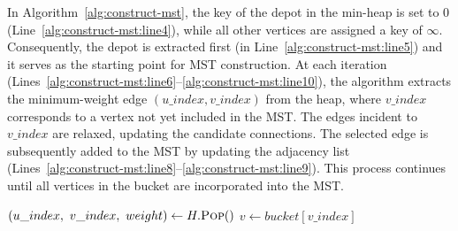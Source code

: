 In Algorithm~\ref{alg:construct-mst}, the key of the depot in the min-heap is set to $0$ (Line~\ref{alg:construct-mst:line4}), while all other vertices are assigned a key of $\infty$. Consequently, the depot is extracted first (in Line~\ref{alg:construct-mst:line5}) and it serves as the starting point for MST construction. At each iteration (Lines~\ref{alg:construct-mst:line6}--\ref{alg:construct-mst:line10}), the algorithm extracts the minimum-weight edge $(u\_index, v\_index)$ from the heap, where $v\_index$ corresponds to a vertex not yet included in the MST. The edges incident to $v\_index$ are relaxed, updating the candidate connections. The selected edge is subsequently added to the MST by updating the adjacency list (Lines~\ref{alg:construct-mst:line8}--\ref{alg:construct-mst:line9}). This process continues until all vertices in the bucket are incorporated into the MST.

\begin{algorithm}[t]
\caption{\textsc{Extract\_Min\_And\_Relax\_Edges}}
\label{alg:extract-relax}
\SetAlgoLined
\SetEndCharOfAlgoLine{}


$(u\_index,\ v\_index,\ weight) \gets H.\textsc{Pop}()$\;     \label{alg:extract-relax:line1}
$v \gets bucket[v\_index]$\;                                  \label{alg:extract-relax:line2}


\;                             \label{alg:extract-relax:line6}

\end{algorithm}

